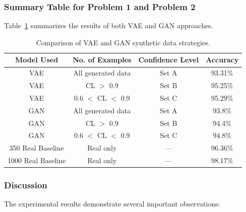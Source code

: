 \subsubsection{Summary Table for Problem 1 and Problem 2}

Table~\ref{tab:final_compare} summarizes the results of both VAE and GAN approaches.

\begin{table}[H]
\centering
\caption{Comparison of VAE and GAN synthetic data strategies.}
\label{tab:final_compare}

\begin{tabular}{|c|c|c|c|}
\hline
\textbf{Model Used} &
\textbf{No. of Examples} &
\textbf{Confidence Level} &
\textbf{Accuracy} \\
\hline

VAE & All generated data & Set A & 93.31\% \\
\hline

VAE & CL $>$ 0.9 & Set B & 95.25\% \\
\hline

VAE & 0.6 $<$ CL $<$ 0.9 & Set C & 95.29\% \\
\hline

GAN & All generated data & Set A & 93.8\% \\
\hline

GAN & CL $>$ 0.9 & Set B & 94.4\% \\
\hline

GAN & 0.6 $<$ CL $<$ 0.9 & Set C & 94.8\% \\
\hline

350 Real Baseline & Real only & --- & 96.36\% \\
\hline

1000 Real Baseline & Real only & --- & 98.17\% \\
\hline

\end{tabular}

\end{table}

\subsubsection{Discussion}

The experimental results demonstrate several important observations:

